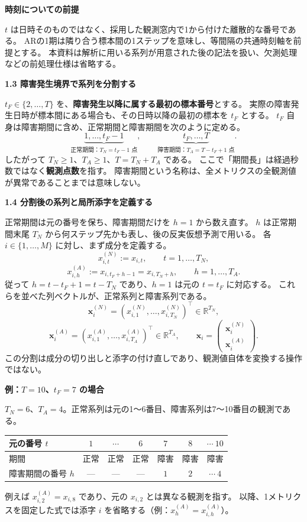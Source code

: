 \documentclass[uplatex,dvipdfmx,fontsize=11pt,baselineskip=17pt,paper=a4]{jlreq}
\newcommand{\head}[1]{\par\bigskip\noindent{\large\bfseries #1}\par\smallskip}
\begin{document}
\textbf{時刻についての前提}

$t$ は日時そのものではなく、採用した観測窓内で1から付けた離散的な番号である。
ARの1期は隣り合う標本間の1ステップを意味し、等間隔の共通時刻軸を前提とする。
本資料は解析に用いる系列が用意された後の記法を扱い、欠測処理などの前処理仕様は省略する。

\newpage
\head{1. 添字と入力系列（続き）}
\textbf{1.3 障害発生境界で系列を分割する}

$t_F\in\{2,\ldots,T\}$ を、\textbf{障害発生以降に属する最初の標本番号}とする。
実際の障害発生日時が標本間にある場合も、その日時以降の最初の標本を $t_F$ とする。
$t_F$ 自身は障害期間に含め、正常期間と障害期間を次のように定める。
\[
\underbrace{1,\ldots,t_F-1}_{\text{正常期間：}T_N=t_F-1\text{ 点}},\qquad
\underbrace{t_F,\ldots,T}_{\text{障害期間：}T_A=T-t_F+1\text{ 点}}.
\]
したがって $T_N\ge1$、$T_A\ge1$、$T=T_N+T_A$ である。
ここで「期間長」は経過秒数ではなく\textbf{観測点数}を指す。
障害期間という名称は、全メトリクスの全観測値が異常であることまでは意味しない。

\textbf{1.4 分割後の系列と局所添字を定義する}

正常期間は元の番号を保ち、障害期間だけを $h=1$ から数え直す。
$h$ は正常期間末尾 $T_N$ から何ステップ先かも表し、後の反実仮想予測で用いる。
各 $i\in\{1,\ldots,M\}$ に対し、まず成分を定義する。
\[
 x_{i,t}^{(N)}:=x_{i,t},\qquad t=1,\ldots,T_N,
\]
\[
 \boxed{x_{i,h}^{(A)}:=x_{i,t_F+h-1}=x_{i,T_N+h}},\qquad h=1,\ldots,T_A.
\]
従って $h=t-t_F+1=t-T_N$ であり、$h=1$ は元の $t=t_F$ に対応する。
これらを並べた列ベクトルが、正常系列と障害系列である。
\[
\mathbf{x}_i^{(N)}=(x_{i,1}^{(N)},\ldots,x_{i,T_N}^{(N)})^\top\in\mathbb R^{T_N},
\]
\[
\mathbf{x}_i^{(A)}=(x_{i,1}^{(A)},\ldots,x_{i,T_A}^{(A)})^\top\in\mathbb R^{T_A},\qquad
\mathbf{x}_i=\begin{pmatrix}\mathbf{x}_i^{(N)}\\\mathbf{x}_i^{(A)}\end{pmatrix}.
\]
この分割は成分の切り出しと添字の付け直しであり、観測値自体を変換する操作ではない。

\textbf{例：$T=10$、$t_F=7$ の場合}

$T_N=6$、$T_A=4$。正常系列は元の1～6番目、障害系列は7～10番目の観測である。
\begin{center}
\begin{tabular}{lcccccc}
\toprule
元の番号 $t$ & $1$ & $\cdots$ & $6$ & $7$ & $8$ & $\cdots\ 10$ \\
\midrule
期間 & 正常 & 正常 & 正常 & 障害 & 障害 & 障害 \\
障害期間の番号 $h$ & --- & --- & --- & $1$ & $2$ & $\cdots\ 4$ \\
\bottomrule
\end{tabular}
\end{center}
例えば $x_{i,2}^{(A)}=x_{i,8}$ であり、元の $x_{i,2}$ とは異なる観測を指す。
以降、1メトリクスを固定した式では添字 $i$ を省略する（例：$x_h^{(A)}=x_{i,h}^{(A)}$）。
\end{document}
